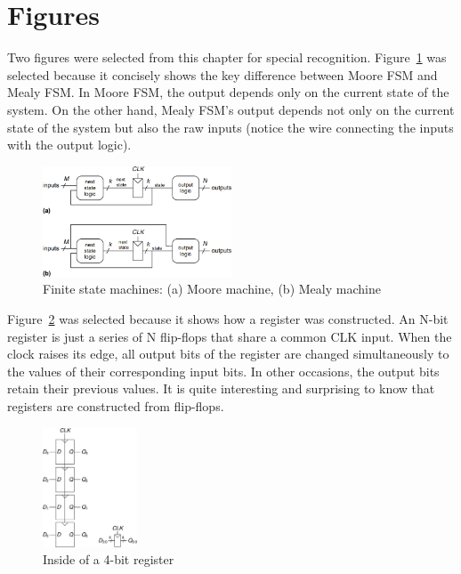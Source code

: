\documentclass[12pt]{article}
\begin{document}
\section{Figures}

Two figures were selected from this chapter for special recognition. Figure~\ref{figure:13} was selected because it concisely shows the key difference between Moore FSM and Mealy FSM. In Moore FSM, the output depends only on the current state of the system. On the other hand, Mealy FSM's output depends not only on the current state of the system but also the raw inputs (notice the wire connecting the inputs with the output logic).

\begin{figure}[ht]
    \centering
    \includegraphics[width=0.5\textwidth]{moore_and_mealy_fsm.png}
    \caption{Finite state machines: (a) Moore machine, (b) Mealy machine}
    \label{figure:13}
\end{figure}

Figure~\ref{figure:14} was selected because it shows how a register was constructed. An N-bit register is just a series of N flip-flops that share a common CLK input. When the clock raises its edge, all output bits of the register are changed simultaneously to the values of their corresponding input bits. In other occasions, the output bits retain their previous values. It is quite interesting and surprising to know that registers are constructed from flip-flops.

\begin{figure}[ht]
    \centering
    \includegraphics[width=0.25\textwidth]{register_4bit.png}
    \caption{Inside of a 4-bit register}
    \label{figure:14}
\end{figure}
\end{document}
